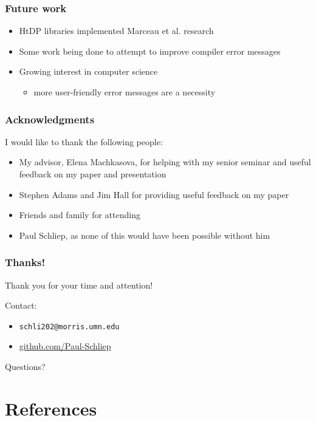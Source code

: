 \documentclass{beamer}
\newcommand{\linespace}{\vskip 0.25cm}
\begin{document}
\begin{frame}
	\frametitle{Future work}
		\begin{itemize}
			\item HtDP libraries implemented Marceau et al. research
			\item Some work being done to attempt to improve compiler error messages
			\item Growing interest in computer science
			\begin{itemize}
				\item more user-friendly error messages are a necessity
			\end{itemize}
		\end{itemize}

\end{frame}

\begin{frame}
	\frametitle{Acknowledgments}
	I would like to thank the following people:
		\begin{itemize}
			\item My advisor, Elena Machkasova, for helping with my senior seminar and useful feedback on my paper and presentation
			\item Stephen Adams and Jim Hall for providing useful feedback on my paper
			\item Friends and family for attending
			\item Paul Schliep, as none of this would have been possible without him
		\end{itemize}

\end{frame}

\begin{frame}
	\frametitle{Thanks!}
	
	Thank you for your time and attention!
		
	\linespace
	\linespace
	
	Contact:  
	\begin{itemize}
		\item \texttt{schli202@morris.umn.edu}
		\item \url{github.com/Paul-Schliep}
	\end{itemize}
	
	\linespace
	\linespace
	
	\begin{center}
	{\huge Questions?}
	\end{center}
\end{frame}

\section*{References}
\end{document}
